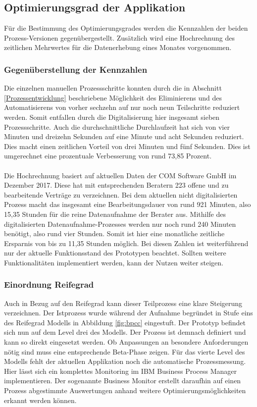 \subsection{Optimierungsgrad der Applikation}
Für die Bestimmung des Optimierungsgrades werden die Kennzahlen der beiden Prozess-Versionen gegenübergestellt. Zusätzlich wird eine Hochrechnung des zeitlichen Mehrwertes für die Datenerhebung eines Monates vorgenommen. 
\subsubsection{Gegenüberstellung der Kennzahlen}
Die einzelnen manuellen Prozessschritte konnten durch die in Abschnitt \ref{Prozessentwicklung} beschriebene Möglichkeit des Eliminierens und des Automatisierens von vorher sechzehn auf nur noch neun Teilschritte reduziert werden. Somit entfallen durch die Digitalisierung hier insgesamt sieben Prozessschritte. Auch die durchschnittliche Durchlaufzeit hat sich von vier Minuten und dreizehn Sekunden auf eine Minute und acht Sekunden reduziert. Dies macht einen zeitlichen Vorteil von drei Minuten und fünf Sekunden. Dies ist umgerechnet eine prozentuale Verbesserung von rund 73,85 Prozent. \\\\
Die Hochrechnung basiert auf aktuellen Daten der COM Software GmbH im Dezember 2017. Diese hat mit entsprechenden Beratern 223 offene und zu bearbeitende Verträge zu verzeichnen. Bei dem aktuellen nicht digitalisierten Prozess macht das insgesamt eine Bearbeitungsdauer von rund 921 Minuten, also 15,35 Stunden für die reine Datenaufnahme der Berater aus. Mithilfe des digitalisierten Datenaufnahme-Prozesses werden nur noch rund 240 Minuten benötigt, also rund vier Stunden. Somit ist hier eine monatliche zeitliche Ersparnis von bis zu 11,35 Stunden möglich. Bei diesen Zahlen ist weiterführend nur der aktuelle Funktionsstand des Prototypen beachtet. Sollten weitere Funktionalitäten implementiert werden, kann der Nutzen weiter steigen. 
\subsubsection{Einordnung Reifegrad}
Auch in Bezug auf den Reifegrad kann dieser Teilprozess eine klare Steigerung verzeichnen. Der Istprozess wurde während der Aufnahme begründet in Stufe eins des Reifegrad Modells in Abbildung \ref{fig:bpcc} eingestuft. Der Prototyp befindet sich nun auf dem Level drei des Modells. Der Prozess ist demnach definiert und kann so direkt eingesetzt werden. Ob Anpassungen an besondere Anforderungen nötig sind muss eine entsprechende Beta-Phase zeigen. Für das vierte Level des Modells fehlt der aktuellen Applikation noch die automatische Prozessmessung. Hier lässt sich ein komplettes Monitoring im IBM Business Process Manager implementieren. Der sogenannte Business Monitor erstellt daraufhin auf einen Prozess abgestimmte Auswertungen anhand weitere Optimierungsmöglichkeiten erkannt werden können.


